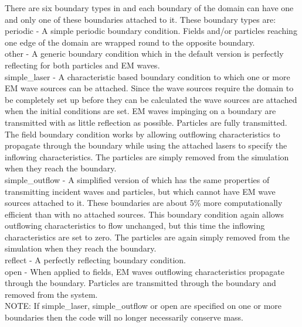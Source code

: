 There are six boundary types in {\EPOCH} and each boundary of the domain can
have one and only one of these boundaries attached to it. These boundary types
are:\\

{\emphtext periodic} - A simple periodic boundary condition. Fields and/or
particles reaching one edge of the domain are wrapped round to the opposite
boundary.\\

{\emphtext other} - A generic boundary condition which in the default {\EPOCH}
version is perfectly reflecting for both particles and EM waves.\\

{\emphtext simple\_laser} - A characteristic based boundary condition to which
one or more EM wave sources can be attached. Since the wave sources require the
domain to be completely set up before they can be calculated the wave sources
are attached when the initial conditions are set.  EM waves impinging on a
 boundary are transmitted with as little reflection
as possible. Particles are fully transmitted. The field boundary condition
works by allowing outflowing characteristics to propagate through the boundary
while using the attached lasers to specify the inflowing characteristics. The
particles are simply removed from the simulation when they reach the
boundary.\\

{\emphtext simple\_outflow} - A simplified version of 
which has the same properties of transmitting incident waves and
particles, but which cannot have EM wave sources attached to it. These
boundaries are about 5\% more computationally efficient than
 with no attached sources. This boundary
condition again allows outflowing characteristics to flow unchanged, but this
time the inflowing characteristics are set to zero. The particles are again
simply removed from the simulation when they reach the boundary.\\

{\emphtext reflect} - A perfectly reflecting boundary condition.\\

{\emphtext open} - When applied to fields, EM waves outflowing characteristics
propagate through the boundary. Particles are transmitted through the boundary
and removed from the system.\\

{\emphtext NOTE: If simple\_laser, simple\_outflow or open are specified on
one or more boundaries then the code will no longer necessarily conserve mass.}

